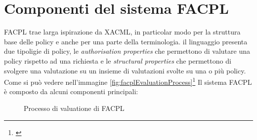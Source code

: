 \section{Componenti del sistema FACPL}
\label{sec:componentiFACPL}
FACPL trae larga ispirazione da XACML, in particolar modo per la struttura base delle policy e anche per una parte della terminologia. il linguaggio presenta due tipoligie di policy, le \emph{authorisation properties} che permettono di valutare una policy rispetto ad una richiesta e le \emph{structural properties} che permettono di svolgere una valutazione su un insieme di valutazioni svolte su una o più policy.
Come si può vedere nell'immagine \ref{fig:facplEvaluationProcess}\footnote{\cite{facpl}} Il sistema FACPL è composto da alcuni componenti principali:
\begin{figure}[h]
    \centering
    
    \caption{Processo di valuatione di FACPL}
  \end{figure}
\label{fig:facplEvaluationProcess}
